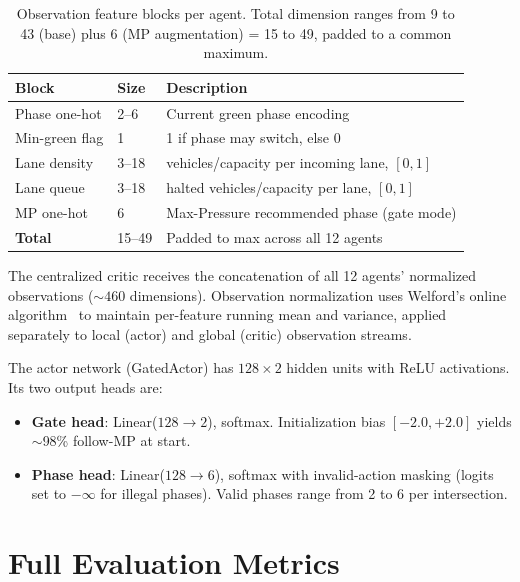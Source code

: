 \documentclass{article}
\begin{document}
\begin{table}[H]
  \centering
  \small
  \caption{Observation feature blocks per agent. Total dimension ranges from 9 to 43 (base) plus 6 (MP augmentation) = 15 to 49, padded to a common maximum.}
  \label{tab:obs_features}
  \begin{tabular}{@{}lll@{}}
    \toprule
    \textbf{Block} & \textbf{Size} & \textbf{Description} \\
    \midrule
    Phase one-hot    & 2--6     & Current green phase encoding \\
    Min-green flag   & 1        & 1 if phase may switch, else 0 \\
    Lane density     & 3--18    & vehicles/capacity per incoming lane, $[0,1]$ \\
    Lane queue       & 3--18    & halted vehicles/capacity per lane, $[0,1]$ \\
    MP one-hot       & 6        & Max-Pressure recommended phase (gate mode) \\
    \midrule
    \textbf{Total}   & 15--49   & Padded to max across all 12 agents \\
    \bottomrule
  \end{tabular}
\end{table}

The centralized critic receives the concatenation of all 12 agents' normalized observations (${\sim}460$ dimensions). Observation normalization uses Welford's online algorithm~\cite{welford} to maintain per-feature running mean and variance, applied separately to local (actor) and global (critic) observation streams.

The actor network (GatedActor) has $128 \times 2$ hidden units with ReLU activations. Its two output heads are:
\begin{itemize}[nosep]
  \item \textbf{Gate head}: Linear($128 \to 2$), softmax. Initialization bias $[-2.0, +2.0]$ yields ${\sim}$98\% follow-MP at start.
  \item \textbf{Phase head}: Linear($128 \to 6$), softmax with invalid-action masking (logits set to $-\infty$ for illegal phases). Valid phases range from 2 to 6 per intersection.
\end{itemize}


\section{Full Evaluation Metrics}
\label{app:full_metrics}
\end{document}
